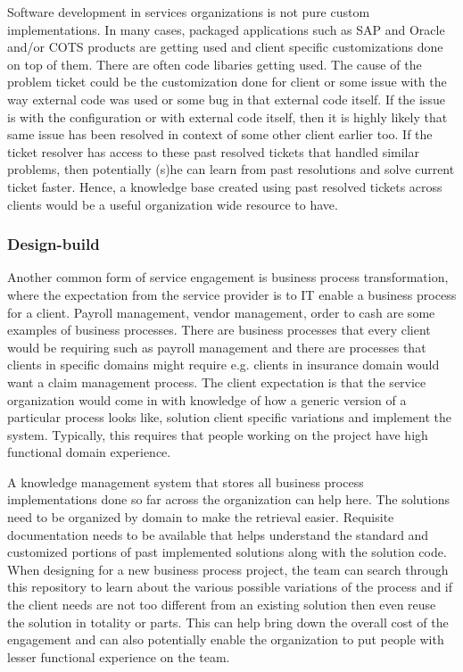 Software development in services organizations is not pure custom implementations. In many cases, packaged applications such as SAP and Oracle and/or COTS products are getting used and client specific customizations done on top of them. There are often code libaries getting used.
The cause of the problem ticket could be the customization done for client or some issue with the way external code was used or some bug in that external code itself. If the issue is with the configuration or with external code itself, then it is highly likely that same issue has been resolved in context of some other client earlier too. If the ticket resolver has access to these past resolved tickets that handled similar problems, then potentially (s)he can learn from past resolutions and solve current ticket faster. Hence, a knowledge base created using past resolved tickets across clients would be a useful organization wide resource to have. 

\subsubsection{Design-build}

Another common form of service engagement is business process transformation, where the expectation from the service provider is to IT enable a business process for a client. Payroll management, vendor management, order to cash are some examples of business processes. There are business processes that every client would be requiring such as payroll management and there are processes that clients in specific domains might require e.g. clients in insurance domain would want a claim management process. The client expectation is that the service organization would come in with knowledge of how a generic version of a particular process looks like, solution client specific variations and implement the system. Typically, this requires that people working on the project have high functional domain experience. 

A knowledge management system that stores all business process implementations done so far across the organization can help here. The solutions need to be organized by domain to make the retrieval easier. Requisite documentation needs to be available that helps understand the standard and customized portions of past implemented solutions along with the solution code. When designing for a new business process project, the team can search through this repository to learn about the various possible variations of the process and if the client needs are not too different from an existing solution then even reuse the solution in totality or parts. This can help bring down the overall cost of the engagement and can also potentially enable the organization to put people with lesser functional experience on the team. 

